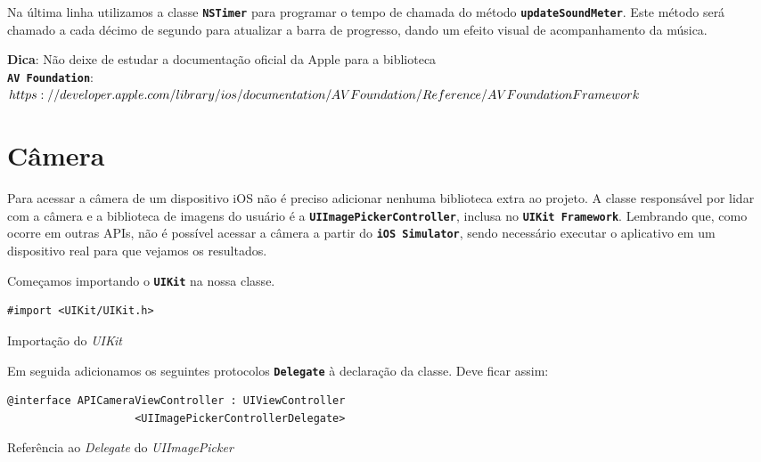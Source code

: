 \documentclass[a4paper,12pt,brazil,doubleside]{book}
\begin{document}
\begin{singlespace}
Na última linha utilizamos a classe \texttt{\textbf{NSTimer}} para programar o tempo de chamada do método \texttt{\textbf{updateSoundMeter}}. Este método será chamado a cada décimo de segundo para atualizar a barra de progresso, dando um efeito visual de acompanhamento da música.

\bigskip

\begin{framed}

\textbf{Dica}: Não deixe de estudar a documentação oficial da Apple para a biblioteca\\  \texttt{\textbf{AV Foundation}}:\\
\(https://developer.apple.com/library/ios/documentation/AVFoundation/Reference/\\AVFoundationFramework\)
\end{framed}

\section{Câmera}


Para acessar a câmera de um dispositivo iOS não é preciso adicionar nenhuma biblioteca extra ao projeto. A classe responsável por lidar com a câmera e a biblioteca de imagens do usuário é a \texttt{\textbf{UIImagePickerController}}, inclusa no \texttt{\textbf{UIKit Framework}}. Lembrando que, como ocorre em outras APIs, não é possível acessar a câmera a partir do \texttt{\textbf{iOS Simulator}}, sendo necessário executar o aplicativo em um dispositivo real para que vejamos os resultados.

Começamos importando o \texttt{\textbf{UIKit}} na nossa classe.

\begin{listing}[H]
\begin{verbatim}
#import <UIKit/UIKit.h>
\end{verbatim}
\caption{Importação do \emph{UIKit}}
\end{listing}


Em seguida adicionamos os seguintes protocolos \texttt{\textbf{Delegate}} à declaração da classe. Deve ficar assim:

\begin{listing}[H]
\begin{verbatim}
@interface APICameraViewController : UIViewController
                    <UIImagePickerControllerDelegate>
\end{verbatim}
\caption{Referência ao \emph{Delegate} do \emph{UIImagePicker}}
\end{listing}



\end{singlespace}
\end{document}
